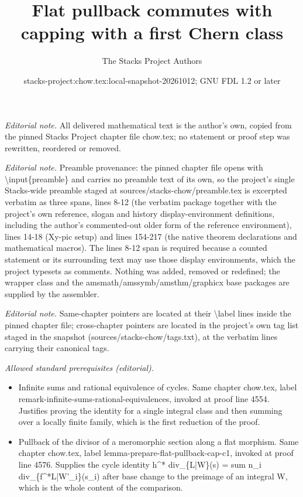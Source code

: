 \documentclass[10pt,a4paper]{amsart}
\title{Flat pullback commutes with capping with a first Chern class}
\author{The Stacks Project Authors}
\date{stacks-project:chow.tex:local-snapshot-20261012; GNU FDL 1.2 or later}
\theoremstyle{plain}
\theoremstyle{definition}
\theoremstyle{remark}
\numberwithin{equation}{subsection}
\begin{document}
\maketitle
\noindent\textit{Editorial note.} All delivered mathematical text is the author's own, copied from the pinned Stacks Project chapter file chow.tex; no statement or proof step was rewritten, reordered or removed.\par\medskip
\noindent\textit{Editorial note.} Preamble provenance: the pinned chapter file opens with \textbackslash{}input\{preamble\} and carries no preamble text of its own, so the project's single Stacks-wide preamble staged at sources/stacks-chow/preamble.tex is excerpted verbatim as three spans, lines 8-12 (the verbatim package together with the project's own reference, slogan and history display-environment definitions, including the author's commented-out older form of the reference environment), lines 14-18 (Xy-pic setup) and lines 154-217 (the native theorem declarations and mathematical macros). The lines 8-12 span is required because a counted statement or its surrounding text may use those display environments, which the project typesets as comments. Nothing was added, removed or redefined; the wrapper class and the amsmath/amssymb/amsthm/graphicx base packages are supplied by the assembler.\par\medskip
\noindent\textit{Editorial note.} Same-chapter pointers are located at their \textbackslash{}label lines inside the pinned chapter file; cross-chapter pointers are located in the project's own tag list staged in the snapshot (sources/stacks-chow/tags.txt), at the verbatim lines carrying their canonical tags.\par\medskip
\noindent\textit{Allowed standard prerequisites (editorial).}\begin{itemize}
\item Infinite sums and rational equivalence of cycles. Same chapter chow.tex, label remark-infinite-sums-rational-equivalences, invoked at proof line 4554. Justifies proving the identity for a single integral class and then summing over a locally finite family, which is the first reduction of the proof.
\item Pullback of the divisor of a meromorphic section along a flat morphism. Same chapter chow.tex, label lemma-prepare-flat-pullback-cap-c1, invoked at proof line 4576. Supplies the cycle identity h\textasciicircum{}* div\_\{L|W\}(s) = sum n\_i div\_\{f\textasciicircum{}*L|W'\_i\}(s\_i) after base change to the preimage of an integral W, which is the whole content of the comparison.
\end{itemize}\medskip
\end{document}
